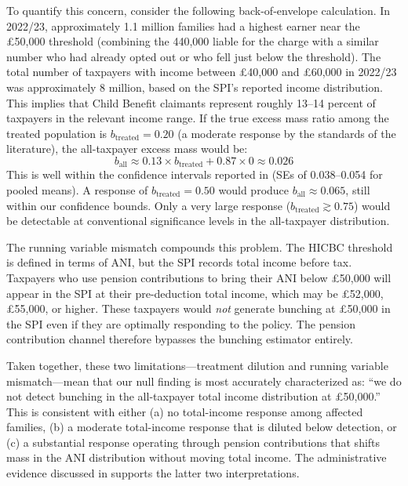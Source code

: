 \documentclass[12pt]{article}
\begin{document}
To quantify this concern, consider the following back-of-envelope calculation. In 2022/23, approximately 1.1 million families had a highest earner near the \pounds50,000 threshold (combining the 440,000 liable for the charge with a similar number who had already opted out or who fell just below the threshold). The total number of taxpayers with income between \pounds40,000 and \pounds60,000 in 2022/23 was approximately 8 million, based on the SPI's reported income distribution. This implies that Child Benefit claimants represent roughly 13--14 percent of taxpayers in the relevant income range. If the true excess mass ratio among the treated population is $b_{\text{treated}} = 0.20$ (a moderate response by the standards of the literature), the all-taxpayer excess mass would be:
\[
b_{\text{all}} \approx 0.13 \times b_{\text{treated}} + 0.87 \times 0 \approx 0.026
\]
This is well within the confidence intervals reported in  (SEs of 0.038--0.054 for pooled means). A response of $b_{\text{treated}} = 0.50$ would produce $b_{\text{all}} \approx 0.065$, still within our confidence bounds. Only a very large response ($b_{\text{treated}} \gtrsim 0.75$) would be detectable at conventional significance levels in the all-taxpayer distribution.

The running variable mismatch compounds this problem. The HICBC threshold is defined in terms of ANI, but the SPI records total income before tax. Taxpayers who use pension contributions to bring their ANI below \pounds50,000 will appear in the SPI at their pre-deduction total income, which may be \pounds52,000, \pounds55,000, or higher. These taxpayers would \emph{not} generate bunching at \pounds50,000 in the SPI even if they are optimally responding to the policy. The pension contribution channel therefore bypasses the bunching estimator entirely.

Taken together, these two limitations---treatment dilution and running variable mismatch---mean that our null finding is most accurately characterized as: ``we do not detect bunching in the all-taxpayer total income distribution at \pounds50,000.'' This is consistent with either (a) no total-income response among affected families, (b) a moderate total-income response that is diluted below detection, or (c) a substantial response operating through pension contributions that shifts mass in the ANI distribution without moving total income. The administrative evidence discussed in  supports the latter two interpretations.
\end{document}
